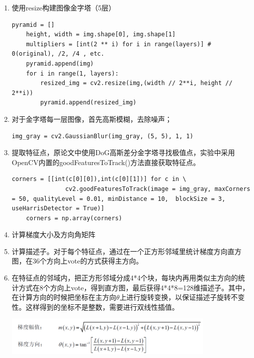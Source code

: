 \documentclass[12pt,a4paper]{article}
\begin{document}
\begin{enumerate}
\item 使用resize构建图像金字塔（5层）
\begin{lstlisting}[style=py]
    pyramid = []
    height, width = img.shape[0], img.shape[1]
    multipliers = [int(2 ** i) for i in range(layers)] # 0(original), /2, /4 , etc.
    pyramid.append(img)
    for i in range(1, layers):
        resized_img = cv2.resize(img,(width // 2**i, height // 2**i))
        pyramid.append(resized_img)
\end{lstlisting}
\item 对于金字塔每一层图像，首先高斯模糊，去除噪声；
\begin{lstlisting}[style=py]
img_gray = cv2.GaussianBlur(img_gray, (5, 5), 1, 1)
\end{lstlisting}
\item 提取特征点，原论文中使用DoG高斯差分金字塔寻找极值点，实验中采用OpenCV内置的goodFeaturesToTrack()方法直接获取特征点。
\begin{lstlisting}[style=py]
corners = [[int(c[0][0]),int(c[0][1])] for c in \
               cv2.goodFeaturesToTrack(image = img_gray, maxCorners = 50, qualityLevel = 0.01, minDistance = 10,  blockSize = 3, useHarrisDetector = True)]
    corners = np.array(corners)
\end{lstlisting}
\item 计算梯度大小及方向角矩阵

\item 计算描述子。对于每个特征点，通过在一个正方形邻域里统计梯度方向直方图，在36个方向上vote的方式获得主方向。
\item 在特征点的邻域内，把正方形邻域分成4*4个块，每块内再用类似主方向的统计方式在8个方向上vote，得到直方图，最后获得4*4*8=128维描述子。其中，在计算方向的时候把坐标在主方向$\theta$上进行旋转变换，以保证描述子旋转不变性。这样得到的坐标不是整数，需要进行双线性插值。
\begin{center}
\includegraphics[width=0.8\textwidth]{grad.png}\\
\end{center}


\end{enumerate}
\end{document}

